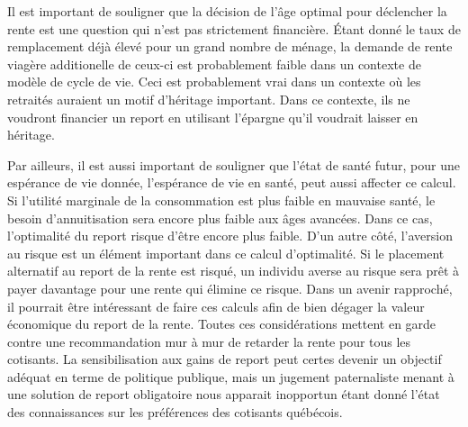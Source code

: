 \documentclass[french, 12pt]{article}
\begin{document}
	Il est important de souligner que la décision de l'âge optimal pour déclencher la rente est une question qui n'est pas strictement financière. Étant donné le taux de remplacement déjà élevé pour un grand nombre de ménage, la demande de rente viagère additionelle de ceux-ci est probablement faible dans un contexte de modèle de cycle de vie. Ceci est probablement vrai dans un contexte où les retraités auraient un motif d'héritage important. Dans ce contexte, ils ne voudront financier un report en utilisant l'épargne qu'il voudrait laisser en héritage. 
	
	Par ailleurs, il est aussi important de souligner que l'état de santé futur, pour une espérance de vie donnée, l'espérance de vie en santé, peut aussi affecter ce calcul. Si l'utilité marginale de la consommation est plus faible en mauvaise santé, le besoin d'annuitisation sera encore plus faible aux âges avancées. Dans ce cas, l'optimalité du report risque d'être encore plus faible. D'un autre côté, l'aversion au risque est un élément important dans ce calcul d'optimalité. Si le placement alternatif au report de la rente est risqué, un individu averse au risque sera prêt à payer davantage pour une rente qui élimine ce risque. Dans un avenir rapproché, il pourrait être intéressant de faire ces calculs afin de bien dégager la valeur économique du report de la rente. Toutes ces considérations mettent en garde contre une recommandation mur à mur de retarder la rente pour tous les cotisants. La sensibilisation aux gains de report peut certes devenir un objectif adéquat en terme de politique publique, mais un jugement paternaliste menant à une solution de report obligatoire nous apparait inopportun étant donné l'état des connaissances sur les préférences des cotisants québécois.  
	 
	
	\newpage
	\clearpage
	
	\newpage
	

	
	\newpage 
	
	
\end{document}
